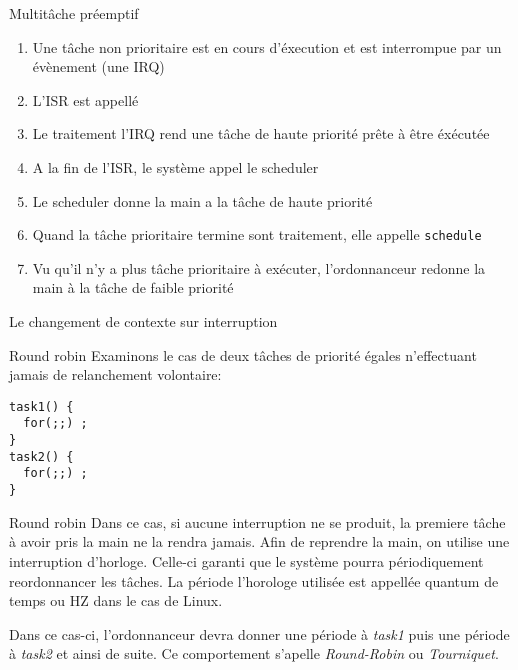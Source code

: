 \begin{frame}{Multitâche préemptif}
  \begin{enumerate}
  \item  Une tâche  non prioritaire  est en  cours d'éxecution  et est
    interrompue par un évènement (une IRQ)
  \item L'ISR est appellé
  \item Le traitement  l'IRQ rend une tâche de  haute priorité prête à
    être éxécutée
  \item A la fin de l'ISR, le système appel le scheduler
  \item Le scheduler donne la main a la tâche de haute priorité
  \item  Quand  la tâche  prioritaire  termine  sont traitement,  elle
    appelle \texttt{schedule}
  \item   Vu  qu'il  n'y   a  plus   tâche  prioritaire   à  exécuter,
    l'ordonnanceur redonne la main à la tâche de faible priorité
  \end{enumerate}
\end{frame}

\begin{frame}{Le changement de contexte sur interruption}
  \begin{center}
  \end{center}
\end{frame}

\begin{frame}[fragile]{Round robin}
  Examinons  le cas de  deux tâches  de priorité  égales n'effectuant
  jamais de relanchement volontaire:
  \begin{lstlisting}
task1() {
  for(;;) ;
}
task2() {
  for(;;) ;
}
  \end{lstlisting}
\end{frame}

\begin{frame}[fragile]{Round robin}
  Dans ce cas, si aucune interruption ne se produit, la premiere tâche
  à avoir pris la main ne la rendra jamais. Afin de reprendre la main,
  on  utilise une  interruption  d'horloge.  Celle-ci  garanti que  le
  système  pourra périodiquement  reordonnancer les  tâches.  La période
  l'horologe utilisée est appellée quantum de temps ou HZ dans le cas de
  Linux.

  Dans   ce  cas-ci,   l'ordonnanceur  devra   donner  une   période  à
  \emph{task1} puis une période à  \emph{task2} et ainsi de suite.  Ce
  comportement s'apelle \emph{Round-Robin} ou \emph{Tourniquet}.
  \begin{center}
    
  \end{center}
\end{frame}


